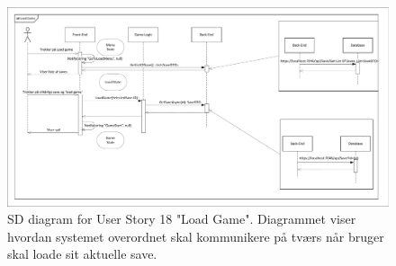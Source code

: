 \begin{figure}[H]
\centering
\includegraphics[width = \textwidth]{02-Body/Images/Arkitektur-SDLoadGame}
\caption{SD diagram for User Story 18 "Load Game". Diagrammet viser hvordan systemet overordnet skal kommunikere på tværs når bruger skal loade sit aktuelle save. }
\label{fig:Arkitektur-SD-LoadGame}
\end{figure}






